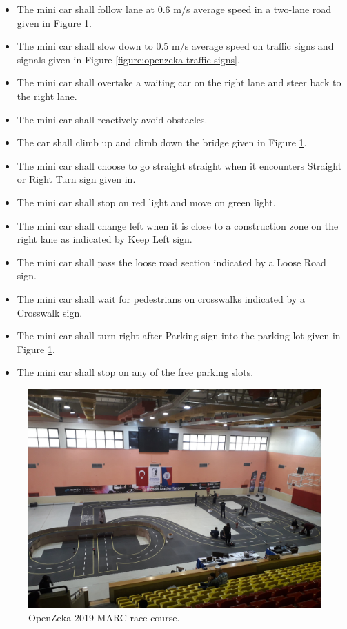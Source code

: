 \begin{itemize}
  \item The mini car shall follow lane at 0.6 m/s average speed in a
      two-lane road given in Figure \ref{figure:openzeka-race-course}.
  \item The mini car shall slow down to 0.5 m/s average speed on traffic signs
      and signals given in Figure \ref{figure:openzeka-traffic-signs}.
  \item The mini car shall overtake a waiting car on the right lane and steer
      back to the right lane.
  \item The mini car shall reactively avoid obstacles.
  \item The car shall climb up and climb down the bridge given in Figure
      \ref{figure:openzeka-race-course}.
  \item The mini car shall choose to go straight straight when it encounters
      Straight or Right Turn sign given in.
  \item The mini car shall stop on red light and move on green light.
  \item The mini car shall change left when it is close to a construction zone
      on the right lane as indicated by Keep Left sign.
  \item The mini car shall pass the loose road section indicated by a Loose
      Road sign.
  \item The mini car shall wait for pedestrians on crosswalks indicated by a
      Crosswalk sign.
  \item The mini car shall turn right after Parking sign into the parking lot
      given in Figure \ref{figure:openzeka-race-course}.
  \item The mini car shall stop on any of the free parking slots.
\end{itemize}

\begin{figure}[h]
  \centering
    \includegraphics[width=.8\textwidth]{figures/openzeka-race-course.jpeg}
  \caption{OpenZeka 2019 MARC race course.}
  \label{figure:openzeka-race-course}
\end{figure}

